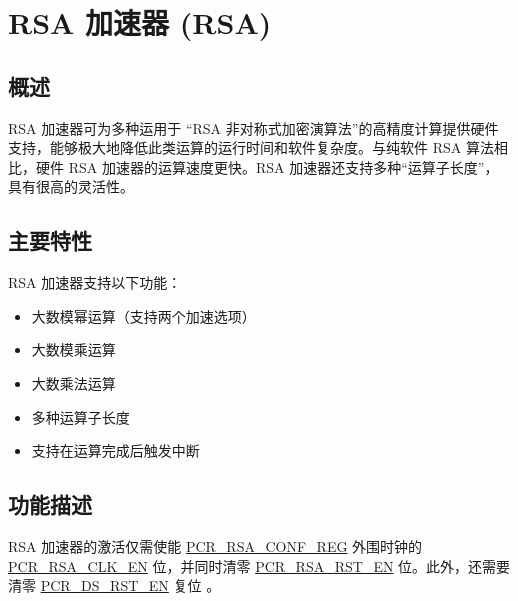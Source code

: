 \documentclass[main\_\_CN.tex]{subfiles}
\begin{document}

\ifglobal
\else
    {\let\clearpage\relax \listoftodos}
    {\let\clearpage\relax \listofdonetodos}
    \tableofcontents
\fi



\hypertarget{rsa}{}
\chapter{RSA 加速器 (RSA)}\label{mod:rsa}

\section{概述}

RSA 加速器可为多种运用于 “RSA 非对称式加密演算法”的高精度计算提供硬件支持，能够极大地降低此类运算的运行时间和软件复杂度。与纯软件 RSA 算法相比，硬件 RSA 加速器的运算速度更快。RSA 加速器还支持多种“运算子长度”，具有很高的灵活性。

\section{主要特性}

RSA 加速器支持以下功能：
\begin{itemize}
    \item 大数模幂运算（支持两个加速选项） 
    \item 大数模乘运算 
    \item 大数乘法运算 
    \item 多种运算子长度
    \item 支持在运算完成后触发中断
\end{itemize}


\section{功能描述}

RSA 加速器的激活仅需使能 \hyperref[regdesc:PCRRSACONFREG]{PCR\_RSA\_CONF\_REG} 外围时钟的 \hyperref[fielddesc:PCRRSACLKEN]{PCR\_RSA\_CLK\_EN} 位，并同时清零 \hyperref[fielddesc:PCRRSARSTEN]{PCR\_RSA\_RST\_EN} 位。此外，还需要清零 \hyperref[fielddesc:PCRDSRSTEN]{PCR\_DS\_RST\_EN} 复位 。
\end{document}
